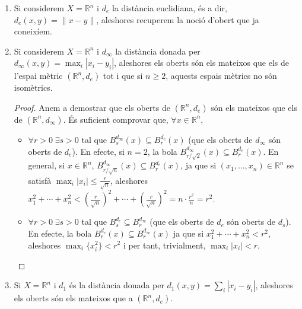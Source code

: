 \documentclass[../main.tex]{subfiles}
\begin{document}
\begin{ej}
\begin{enumerate}[(1)]
    
    \item Si considerem $X =\mathbb{R}^n$ i $d_e$ la distància euclidiana, és a dir, $d_e(x,y) = \|x-y\|$, aleshores recuperem la noció d'obert que ja coneixíem.
    
    \item Si considerem $X = \mathbb{R}^n$ i $d_\infty$ la distància donada per $d_\infty(x,y) = \max_i|x_i-y_i|$, aleshores els oberts són els mateixos que els de l'espai mètric $(\mathbb{R}^n,d_e)$ tot i que si $n\geq 2$, aquests espais mètrics no són isomètrics.
    \begin{proof}
    Anem a demostrar que els oberts de $(\mathbb{R}^n,d_e)$ són els mateixos que els de $(\mathbb{R}^n,d_\infty)$. És suficient comprovar que, $\forall x\in\mathbb{R}^n$,
    \begin{itemize}
        \item $\forall r>0\;\exists s>0$ tal que $B_s^{d_\infty}(x)\subseteq B_r^{d_e}(x)$ (que els oberts de $d_\infty$ són oberts de $d_e$). En efecte, si $n=2$, la bola $B_{r/\sqrt{2}}^{d_\infty}(x)\subseteq B_r^{d_e}(x)$. En general, si $x\in\mathbb{R}^n$, $B_{r/\sqrt{n}}^{d_\infty}(x)\subseteq B_r^{d_e}(x)$, ja que si $(x_1,\ldots,x_n)\in\mathbb{R}^n$ se satisfà $\max_i|x_i|\leq \frac{r}{\sqrt{n}}$, aleshores $x_1^2+\cdots+x_n^2< \left(\frac{r}{\sqrt{n}}\right)^2+\cdots+\left(\frac{r}{\sqrt{n}}\right)^2 = n\cdotp\frac{r^2}{n} = r^2$.
        
        \item $\forall r>0\;\exists s>0$ tal que $B_s^{d_e}\subseteq B_r^{d_\infty}$ (que els oberts de $d_e$ són oberts de $d_s$). En efecte, la bola $B_r^{d_e}(x)\subseteq B_r^{d_\infty}(x)$ ja que si $x_1^2+\cdots+x_n^2< r^2$, aleshores $\max_i\{x_i^2\}< r^2$ i per tant, trivialment, $\max_i|x_i|< r$.
    \end{itemize}
    \end{proof}
    
    
    \item Si $X = \mathbb{R}^n$ i $d_1$ és la distància donada per $d_1(x,y) = \sum_i|x_i-y_i|$, aleshores els oberts són els mateixos que a $(\mathbb{R}^n,d_e)$.
\end{enumerate}
\end{ej}
\end{document}
